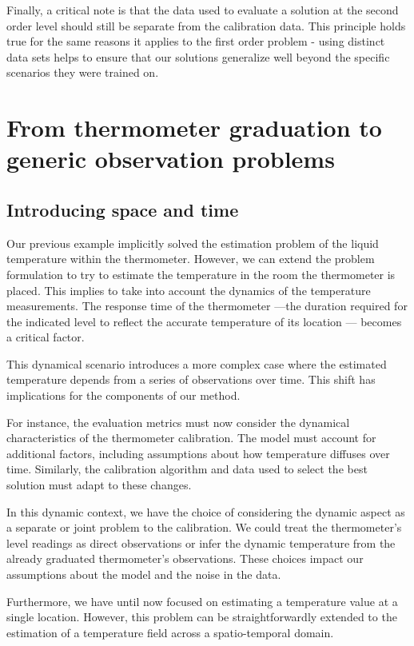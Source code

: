 \begin{bibunit}
Finally, a critical note is that the data used to evaluate a solution at the second order level should still be separate from the calibration data. This principle holds true for the same reasons it applies to the first order problem - using distinct data sets helps to ensure that our solutions generalize well beyond the specific scenarios they were trained on.

\section{From thermometer graduation to generic observation problems}
\subsection{Introducing space and time}
Our previous example implicitly solved the estimation problem of the liquid temperature  within the thermometer. However, we can extend the problem formulation to try to estimate the temperature in the room the thermometer is placed. This implies to take into account the dynamics of the temperature measurements. The response time of the thermometer —the duration required for the indicated level to reflect the accurate temperature of its location — becomes a critical factor.

This dynamical scenario introduces a more complex case where the estimated temperature depends from a series of observations over time. This shift has implications for the components of our method.

For instance, the evaluation metrics must now consider the dynamical characteristics of the thermometer calibration. The model must account for additional factors, including assumptions about how temperature diffuses over time. Similarly, the calibration algorithm and data used to select the best solution must adapt to these changes.

In this dynamic context, we have the choice of considering the dynamic aspect as a separate or joint problem to the calibration. We could treat the thermometer's level readings as direct observations or infer the dynamic temperature from the already graduated thermometer's observations. These choices impact our assumptions about the model and the noise in the data.

Furthermore, we have until now focused on estimating a temperature value at a single location. However, this problem can be straightforwardly extended to the estimation of a temperature field across a spatio-temporal domain.


\end{bibunit}
